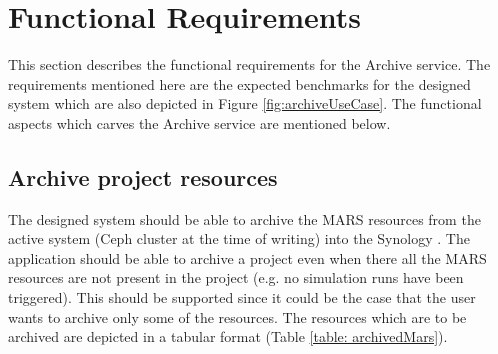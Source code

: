 \newpage
\section{Functional Requirements}
    \label{section:functionalReq}
    This section describes the functional requirements for the Archive service.
    The requirements mentioned here are the expected benchmarks for the designed system which are also depicted in Figure \ref{fig:archiveUseCase}.
    The functional aspects which carves the Archive service are mentioned below.

    \subsection{Archive project resources}
        The designed system should be able to archive the MARS resources from the active system (Ceph cluster at the time of writing) 
        into the Synology \cite{Synology}. The application should
        be able to archive a project even when there all the MARS resources are not present in the project (e.g. no simulation runs have been triggered).
        This should be supported since it could be the case that the user wants to archive only some of the resources. The resources which are to be archived
        are depicted in a tabular format (Table \ref{table: archivedMars}).
        
